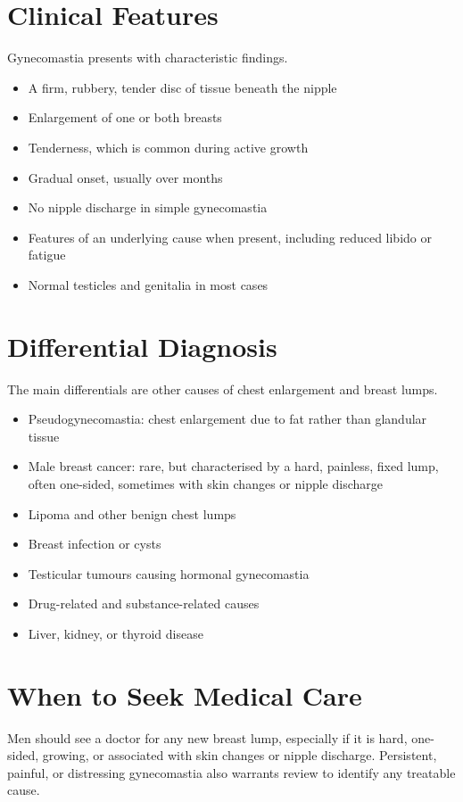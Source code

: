 \section*{Clinical Features}
Gynecomastia presents with characteristic findings.

\begin{itemize}
    \item A firm, rubbery, tender disc of tissue beneath the nipple
    \item Enlargement of one or both breasts
    \item Tenderness, which is common during active growth
    \item Gradual onset, usually over months
    \item No nipple discharge in simple gynecomastia
    \item Features of an underlying cause when present, including reduced libido or fatigue
    \item Normal testicles and genitalia in most cases
\end{itemize}

\section*{Differential Diagnosis}
The main differentials are other causes of chest enlargement and breast lumps.

\begin{itemize}
    \item Pseudogynecomastia: chest enlargement due to fat rather than glandular tissue
    \item Male breast cancer: rare, but characterised by a hard, painless, fixed lump, often one-sided, sometimes with skin changes or nipple discharge
    \item Lipoma and other benign chest lumps
    \item Breast infection or cysts
    \item Testicular tumours causing hormonal gynecomastia
    \item Drug-related and substance-related causes
    \item Liver, kidney, or thyroid disease
\end{itemize}

\section*{When to Seek Medical Care}
Men should see a doctor for any new breast lump, especially if it is hard, one-sided, growing, or associated with skin changes or nipple discharge. Persistent, painful, or distressing gynecomastia also warrants review to identify any treatable cause.


